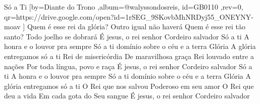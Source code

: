 \beginsong
{Só a Ti %
}[by={Diante do Trono %
},album={@walyssondosreis},
id={GB0110 %
},rev={0}, %
qr={https://drive.google.com/open?id=1rSEG_9SKovbMhNRDyj55_ONEYNY-moav %
}]
\beginverse*
Quem é esse rei da glória?
Outro igual não haverá
Quem é esse rei tão santo?
Todo joelho se dobrará
É jesus, o rei senhor
Cordeiro salvador
\endverse
\beginchorus
Só a ti
A honra e o louvor pra sempre
Só a ti domínio sobre o céu e a terra
Glória
A glória entregamos só a ti
\endchorus
\beginverse*
Rei de misericórdia
De maravilhosa graça
Rei louvado entre a nações
Por toda língua, povo e raça
\endverse
\beginverse*
É jesus, o rei senhor
Cordeiro salvador
Só a ti
A honra e o louvor pra sempre
Só a ti domínio sobre o céu e a terra
Glória
A glória entregamos só a ti
\endverse
\beginverse*
O Rei que nos salvou
Poderoso em seu amor
O Rei que deu a vida
Em cada gota do Seu sangue
É jesus, o rei senhor
Cordeiro salvador
\endverse

